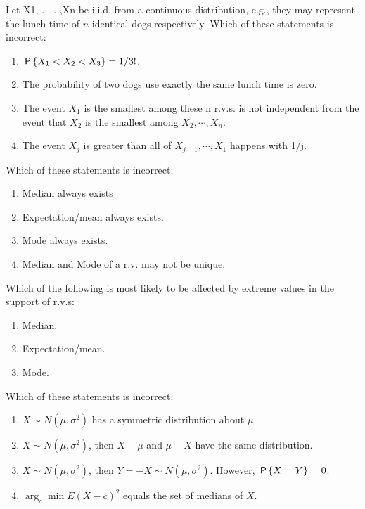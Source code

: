 \documentclass[poll_tutorial_format]{subfiles}
\begin{document}
	
	\begin{exercise}
		Let X1, . . . ,Xn be i.i.d. from a continuous distribution, e.g., they may represent the lunch time of $n$ identical dogs respectively.
		Which of these statements is incorrect:
		\begin{enumerate}
			\item $\P{X_1<X_2<X_3}=1/3!$.
			\item The probability of two dogs use exactly the same lunch time is zero.		
			\item The event $X_1$ is the smallest among these n r.v.s. is not independent from the event that $X_2$ is the smallest among $X_2,\cdots, X_n$.
			\item The event $X_j$ is greater than all of
			$X_{j-1},\cdots,X_1$ happens with 1/j.
		\end{enumerate}
	\end{exercise}
	
	
	\begin{exercise}
		Which of these statements is incorrect:
		\begin{enumerate}
			\item Median always exists 
			\item Expectation/mean always exists.
			\item Mode always exists.
			\item Median and Mode of a r.v. may not be unique. 
		\end{enumerate}
	\end{exercise}
	
	
	
	\begin{exercise}
		Which of the following is most likely to be affected by extreme values in the support of r.v.s:
		\begin{enumerate}
			\item Median.
			\item Expectation/mean.
			\item Mode. 
		\end{enumerate}
	\end{exercise}
	
	
	
	\begin{exercise}
		Which of these statements is incorrect: 
		\begin{enumerate}
			\item $X\sim N(\mu,\sigma^2)$ has a symmetric
			distribution about $\mu$.
			\item $X\sim N(\mu,\sigma^2)$, then $X-\mu$ and $\mu-X$ have the same distribution.
			\item $X\sim N(\mu,\sigma^2)$, then $Y=-X\sim N(\mu,\sigma^2)$. However, $\P{X=Y}=0$.   
			\item $\arg_c \min E(X-c)^2$ equals the set of medians of $X$.   
		\end{enumerate}
	\end{exercise}
	
\end{document}
